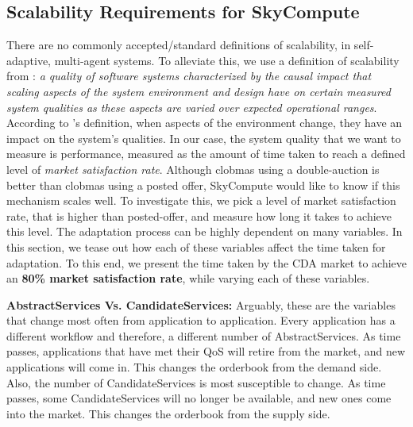 \documentclass[10pt,journal,compsoc]{IEEEtran}
\begin{document}
\subsection{Scalability Requirements for SkyCompute}
There are no commonly accepted/standard definitions of scalability, in self-adaptive, multi-agent systems. To alleviate this, we use a definition of scalability from \cite{Duboc2007framework}: \textit{a quality of software systems characterized by the causal impact that scaling aspects of the system environment and design have on certain measured system qualities as these aspects are varied over expected operational ranges}.\\
According to \cite{Duboc2007framework}'s definition, when aspects of the environment change, they have an impact on the system's qualities. In our case, the system quality that we want to measure is performance, measured as the amount of time taken to reach a defined level of \textit{market satisfaction rate}. Although clobmas using a double-auction is better than clobmas using a posted offer, SkyCompute would like to know if this mechanism scales well. To investigate this, we pick a level of market satisfaction rate, that is higher than posted-offer, and measure how long it takes to achieve this level. The adaptation process can be highly dependent on many variables. In this section, we tease out how each of these variables affect the time taken for adaptation. To this end, we present the time taken by the CDA market to achieve an \textbf{80\%  market satisfaction rate}, while varying each of these variables.

\textbf{AbstractServices Vs. CandidateServices:}
Arguably, these are the variables that change most often from application to application. Every application has a different workflow and therefore, a different number of AbstractServices. As time passes, applications that have met their QoS will retire from the market, and new applications will come in. This changes the orderbook from the demand side. Also, the number of CandidateServices is most susceptible to change. As time passes, some CandidateServices will no longer be available, and new ones come into the market. This changes the orderbook from the supply side.
\end{document}
